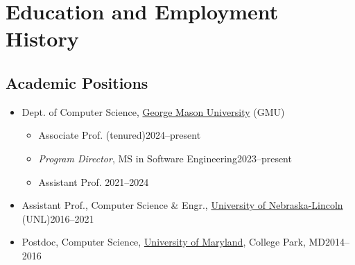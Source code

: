\documentclass[11pt]{article}
\begin{document}

\section{Education and Employment History}
\subsection{Academic Positions}

\begin{itemize}
    \item Dept. of Computer Science, \href{https://cs.gmu.edu}{George Mason University} (GMU)
    \begin{itemize}
        \item Associate Prof. (tenured)\hfill 2024--present
        \item \emph{Program Director}, MS in Software Engineering\hfill 2023--present
        \item Assistant Prof. \hfill 2021--2024
        
    \end{itemize}
    
    \item Assistant Prof., Computer Science \& Engr., \href{https://computing.unl.edu}{University of Nebraska-Lincoln} (UNL)\hfill 2016--2021
    
    \item Postdoc, Computer Science,  \href{https://www.umd.edu}{University of Maryland}, College Park, MD\hfill 2014--2016

\end{itemize}
\end{document}
